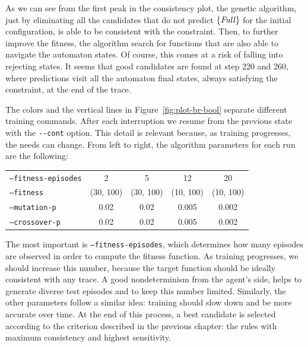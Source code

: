 As we can see from the first peak in the consistency plot, the genetic
algorithm, just by eliminating all the candidates that do not predict
$\{\text{\textit{Full}}\}$ for the initial configuration, is able to be consistent
with the constraint. Then, to further improve the fitness, the algorithm
search for functions that are also able to navigate the automaton states. Of
course, this comes at a risk of falling into rejecting states.
It seems that good candidates are found at step 220 and 260, where predictions
visit all the automaton final states, always satisfying the constraint, at the
end of the trace.

The colors and the vertical lines in Figure~\ref{fig:plot-br-bool} separate
different training commands. After each interruption we resume from the
previous state with the \verb|--cont| option. This detail is relevant because,
as training progresses, the needs can change. From left to right, the
algorithm parameters for each run are the following:
\begin{center}
\begin{tabular}{l*4c}
	\texttt{--fitness-episodes} & 2 & 5 & 12 & 20 \\
	\texttt{--fitness} & (30, 100) & (30, 100) & (10, 100) & (10, 100) \\
	\texttt{--mutation-p} & 0.02 & 0.02 & 0.005 & 0.002 \\
	\texttt{--crossover-p} & 0.02 & 0.02 & 0.005 & 0.002
\end{tabular}
\end{center}
The most important is \texttt{--fitness-episodes}, which determines how many
episodes are observed in order to compute the fitness function. As training
progresses, we should increase this number, because the target function should
be ideally consistent with any trace. A good nondeterminism from the agent's
side, helps to generate diverse test episodes and to keep this number limited.
Similarly, the other parameters follow a similar idea: training should slow
down and be more accurate over time.  At the end of this process, a best
candidate is selected according to the criterion described in the previous
chapter: the rules with maximum consistency and highest sensitivity.

